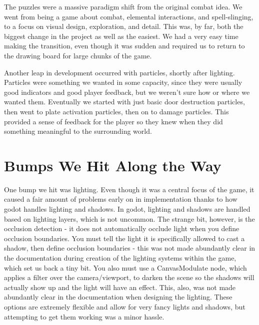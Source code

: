 \documentclass{sigchi}
\begin{document}
The puzzles were a massive paradigm shift from the original combat idea.  We went from being a game about combat, elemental interactions, and spell-slinging, to a focus on visual design, exploration, and detail.  This was, by far, both the biggest change in the project as well as the easiest.  We had a very easy time making the transition, even though it was sudden and required us to return to the drawing board for large chunks of the game.

Another leap in development occurred with particles, shortly after lighting.  Particles were something we wanted in some capacity, since they were usually good indicators and good player feedback, but we weren't sure how or where we wanted them.  Eventually we started with just basic door destruction particles, then went to plate activation particles, then on to damage particles.  This provided a sense of feedback for the player so they knew when they did something meaningful to the surrounding world.


\section{Bumps We Hit Along the Way}
One bump we hit was lighting.  Even though it was a central focus of the game, it caused a fair amount of problems early on in implementation thanks to how godot handles lighting and shadows.  In godot, lighting and shadows are handled based on lighting layers, which is not uncommon.  The strange bit, however, is the occlusion detection - it does not automatically occlude light when you define occlusion boundaries.  You must tell the light it is specifically allowed to cast a shadow, then define occlusion boundaries - this was not made abundantly clear in the documentation during creation of the lighting systems within the game, which set us back a tiny bit.  You also must use a CanvasModulate node, which applies a filter over the camera/viewport, to darken the scene so the shadows will actually show up and the light will have an effect.  This, also, was not made abundantly clear in the documentation when designing the lighting.  These options are extremely flexible and allow for very fancy lights and shadows, but attempting to get them working was a minor hassle.




\end{document}
